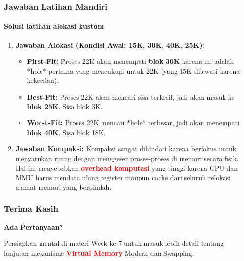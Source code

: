 \documentclass[t,aspectratio=169,xcolor=dvipsnames]{beamer}
\newcommand{\tem}[1]{\textbf{\textcolor{red}{#1}}}
\begin{document}
\begin{frame}
    \frametitle{Jawaban Latihan Mandiri}
    \framesubtitle{Solusi latihan alokasi kustom}
    \small
    \begin{enumerate}
        \item \textbf{Jawaban Alokasi (Kondisi Awal: 15K, 30K, 40K, 25K):}
        \begin{itemize}
            \item \textbf{First-Fit:} Proses 22K akan menempati \textbf{blok 30K} karena ini adalah *hole* pertama yang mencukupi untuk 22K (yang 15K dilewati karena kekecilan).
            \item \textbf{Best-Fit:} Proses 22K akan mencari sisa terkecil, jadi akan masuk ke \textbf{blok 25K}. Sisa blok 3K.
            \item \textbf{Worst-Fit:} Proses 22K mencari *hole* terbesar, jadi akan menempati \textbf{blok 40K}. Sisa blok 18K.
        \end{itemize}
        \vspace{0.4cm}
        \item \textbf{Jawaban Kompaksi:} Kompaksi sangat dihindari karena berfokus untuk menyatukan ruang dengan menggeser proses-proses di memori secara fisik. Hal ini menyebabkan \tem{overhead komputasi} yang tinggi karena CPU dan MMU harus mendata ulang register maupun cache dari seluruh relokasi alamat memori yang berpindah.
    \end{enumerate}
\end{frame}

\begin{frame}
    \frametitle{Terima Kasih}
    \begin{center}
        \Huge \textbf{Ada Pertanyaan?}

        \vspace{0.8cm}
        \normalsize
        Persiapkan mental di materi Week ke-7 untuk masuk lebih detail tentang lanjutan mekanisme \tem{Virtual Memory} Modern dan Swapping.
    \end{center}
\end{frame}
\end{document}
